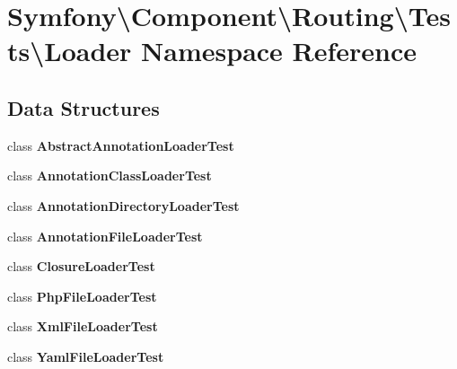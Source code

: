 \section{Symfony\textbackslash{}Component\textbackslash{}Routing\textbackslash{}Tests\textbackslash{}Loader Namespace Reference}
\label{namespace_symfony_1_1_component_1_1_routing_1_1_tests_1_1_loader}
\subsection*{Data Structures}
\begin{DoxyCompactItemize}
\item 
class {\bf Abstract\+Annotation\+Loader\+Test}
\item 
class {\bf Annotation\+Class\+Loader\+Test}
\item 
class {\bf Annotation\+Directory\+Loader\+Test}
\item 
class {\bf Annotation\+File\+Loader\+Test}
\item 
class {\bf Closure\+Loader\+Test}
\item 
class {\bf Php\+File\+Loader\+Test}
\item 
class {\bf Xml\+File\+Loader\+Test}
\item 
class {\bf Yaml\+File\+Loader\+Test}
\end{DoxyCompactItemize}
